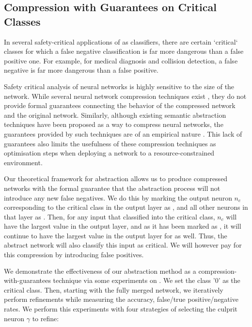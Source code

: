 
\subsection{Compression with Guarantees on Critical Classes}
\label{s:exp-mnist-comp}


In several safety-critical applications of \dnn as classifiers, there are
certain `critical` classes for which a false negative classification is far more
dangerous than a false positive one. For example, for medical diagnosis and
collision detection, a false negative is far more dangerous than a false
positive.

Safety critical analysis of neural networks is highly sensitive to the size of
the network. While several neural network compression techniques exist 
\cite{dnn-compression}, they do not provide formal guarantees 
connecting the behavior of the compressed network and the original network.
Similarly, although existing semantic abstraction techniques have been proposed
as a way to compress neural networks, the guarantees provided by such 
techniques are of an empirical nature \cite{lin-comb-abs-jan}.
This lack of guarantees also limits the usefulness of these compression
techniques as optimisation steps when deploying a network to a
resource-constrained environment. 

Our theoretical framework for abstraction allows us to produce compressed
networks with the formal guarantee that the abstraction process will not
introduce any new false negatives. We do this by marking the output neuron $n_c$
corresponding to the critical class in the output layer as \inc, and all other
neurons in that layer as \dec.  Then, for any input that \cnc classified into
the critical class, $n_c$ will have the largest value in the
output layer, and as it has been marked as \inc, it will continue to have the
largest value in the output layer for \abs as well. Thus, the
abstract network will also classify this input as critical. We will however pay
for this compression by introducing false positives.

We demonstrate the effectiveness of our abstraction method as a
compression-with-guarantees technique via some experiments on \mnist. We set the
class '0'
as the critical class. Then, starting with the fully merged network, we
iteratively perform refinements while measuring the accuracy, false/true
positive/negative rates. We perform this experiments with four strategies of
selecting the culprit neuron $\gamma$ to refine:

